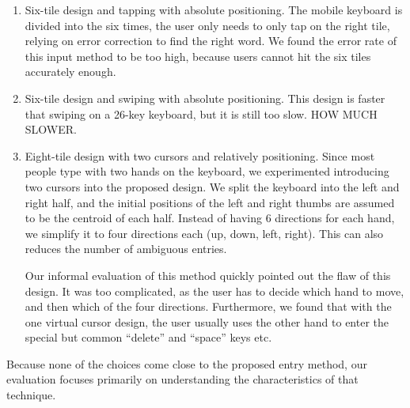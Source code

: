 \begin{enumerate}
\item
Six-tile design and tapping with absolute positioning.  The mobile keyboard is divided into the six times, the user only needs to only tap on the right tile, relying on error correction to find the right word.   We found the error rate of this input method to be too high, because users cannot hit the six tiles accurately enough. 

\item
Six-tile design and swiping with absolute positioning.  This design is faster that swiping on a 26-key keyboard, but it is still too slow.  HOW MUCH SLOWER.

\item 
Eight-tile design with two cursors and relatively positioning.  Since most people type with two hands on the keyboard, we experimented introducing two cursors into the proposed design.  We split the keyboard into the left and right half, and the initial positions of the left and right thumbs are assumed to be the centroid of each half.  Instead of having 6 directions for each hand, we simplify it to four directions each (up, down, left,  right).  This can also reduces the number of ambiguous entries. 

Our informal evaluation of this method quickly pointed out the flaw of this design.  It was too complicated, as the user has to decide which hand to move, and then which of the four directions.  Furthermore, we found that with the one virtual cursor design, the user usually uses the other hand to enter the special but common “delete” and “space” keys etc. 
\end{enumerate}

Because none of the choices come close to the proposed entry method, our evaluation focuses primarily on understanding the characteristics of that technique. 

